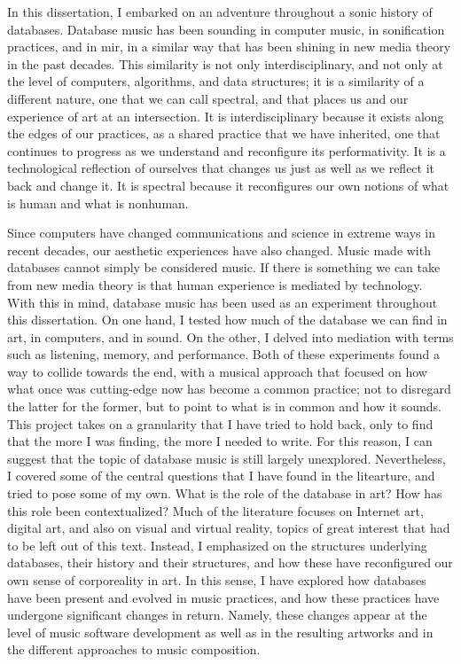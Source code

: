 In this dissertation, I embarked on an adventure throughout a sonic history of databases. Database music has been sounding in computer music, in sonification practices, and in \gls{mir}, in a similar way that has been shining in new media theory in the past decades. This similarity is not only interdisciplinary, and not only at the level of computers, algorithms, and data structures; it is a similarity of a different nature, one that we can call spectral, and that places us and our experience of art at an intersection. It is interdisciplinary because it exists along the edges of our practices, as a shared practice that we have inherited, one that continues to progress as we understand and reconfigure its performativity. It is a technological reflection of ourselves that changes us just as well as we reflect it back and change it. It is spectral because it reconfigures our own notions of what is human and what is nonhuman.

Since computers have changed communications and science in extreme ways in recent decades, our aesthetic experiences have also changed. Music made with databases cannot simply be considered music. If there is something we can take from new media theory is that human experience is mediated by technology. With this in mind, database music has been used as an experiment throughout this dissertation. On one hand, I tested how much of the database we can find in art, in computers, and in sound. On the other, I delved into mediation with terms such as listening, memory, and performance. Both of these experiments found a way to collide towards the end, with a musical approach that focused on how what once was cutting-edge now has become a common practice; not to disregard the latter for the former, but to point to what is in common and how it sounds. This project takes on a granularity that I have tried to hold back, only to find that the more I was finding, the more I needed to write. For this reason, I can suggest that the topic of database music is still largely unexplored. Nevertheless, I covered some of the central questions that I have found in the litearture, and tried to pose some of my own. What is the role of the database in art? How has this role been contextualized? Much of the literature focuses on Internet art, digital art, and also on visual and virtual reality, topics of great interest that had to be left out of this text. Instead, I emphasized on the structures underlying databases, their history and their structures, and how these have reconfigured our own sense of corporeality in art. In this sense, I have explored how databases have been present and evolved in music practices, and how these practices have undergone significant changes in return. Namely, these changes appear at the level of music software development as well as in the resulting artworks and in the different approaches to music composition. 

